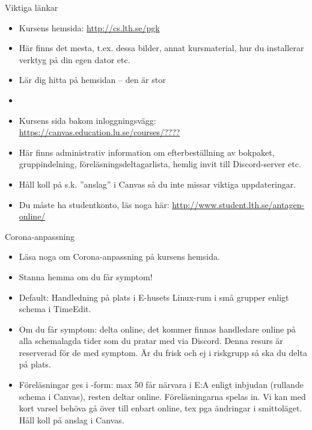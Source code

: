 \begin{SlideExtra}{Viktiga länkar}
  \begin{itemize}
    \item Kursens  hemsida: \url{http://cs.lth.se/pgk}
    \item[] Här finns det mesta, t.ex. dessa bilder, annat kursmaterial, hur du installerar verktyg på din egen dator etc.
    \item[] Lär dig hitta på hemsidan -- den är stor 
    \item[]  
    \item Kursens  sida bakom inloggningsvägg: \TODO \url{https://canvas.education.lu.se/courses/????}
    \item[] Här finns administrativ information om efterbeställning av bokpaket, gruppindelning, föreläsningsdeltagarlista, hemlig invit till Discord-server etc. 
    \item[] Håll koll på s.k. ''anslag'' i Canvas så du inte missar viktiga uppdateringar.  
    \item[] Du måste ha studentkonto, läs noga här: \url{http://www.student.lth.se/antagen-online/} 
  \end{itemize}
\end{SlideExtra}

\begin{SlideExtra}{Corona-anpassning}
  \TODO 
  \begin{itemize}
    \item Läsa noga om Corona-anpassning på kursens hemsida.
    \item {} Stanna hemma om du får symptom!
    \item Default: Handledning på plats i E-husets Linux-rum i små grupper enligt schema i TimeEdit. 
    \item Om du får symptom: delta online, det kommer finnas handledare online på alla schemalagda tider som du pratar med via Discord. Denna resurs är reserverad för de med symptom. Är du frisk och ej i riskgrupp så ska du delta på plats. 
    \item Föreläsningar ges i -form: max 50 får närvara i E:A enligt inbjudan (rullande schema i Canvas), resten deltar online. Föreläsningarna spelas in. Vi kan med kort varsel behöva gå över till enbart online, tex pga ändringar i smittoläget. Håll koll på anslag i Canvas.
  \end{itemize}
\end{SlideExtra}
\fi


